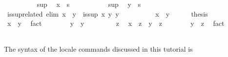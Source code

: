 \begin{isabellebody}
\ \ \ \ \ \ \ \ \isamarkupfalse%
\ sup\ \isamarkupfalse%
\ {\isachardoublequoteopen}x\ {\isasymsqsubseteq}\ s{\isachardoublequoteclose}\ \isacommand{{\isachardot}{\isachardot}}\isamarkupfalse%
\isanewline
\ \ \ \ \ \ \ \ \isamarkupfalse%
\ sup\ \isamarkupfalse%
\ {\isachardoublequoteopen}y\ {\isasymsqsubseteq}\ s{\isachardoublequoteclose}\ \isacommand{{\isachardot}{\isachardot}}\isamarkupfalse%
\isanewline
\ \ \ \ \ \ \isamarkupfalse%
\isanewline
\ \ \ \ \isamarkupfalse%
\isanewline
\ \ \isamarkupfalse%
%
\endisatagproof
{\isafoldproof}%
%
\isadelimproof
\isanewline
%
\endisadelimproof
%
\isadeliminvisible
\isanewline
\ \ %
\endisadeliminvisible
%
\isataginvisible
{}\isamarkupfalse%
\ is{\isacharunderscore}sup{\isacharunderscore}related\ {\isacharbrackleft}elim{\isacharquery}{\isacharbrackright}{\isacharcolon}\ {\isachardoublequoteopen}x\ {\isasymsqsubseteq}\ y\ {\isasymLongrightarrow}\ is{\isacharunderscore}sup\ x\ y\ y{\isachardoublequoteclose}\isanewline
\ \ \isamarkupfalse%
\ {\isacharminus}\isanewline
\ \ \ \ \isamarkupfalse%
\ {\isachardoublequoteopen}x\ {\isasymsqsubseteq}\ y{\isachardoublequoteclose}\isanewline
\ \ \ \ \isamarkupfalse%
\ {\isacharquery}thesis\isanewline
\ \ \ \ \isamarkupfalse%
\isanewline
\ \ \ \ \ \ \isamarkupfalse%
\ {\isachardoublequoteopen}x\ {\isasymsqsubseteq}\ y{\isachardoublequoteclose}\ \isamarkupfalse%
\ fact\isanewline
\ \ \ \ \ \ \isamarkupfalse%
\ {\isachardoublequoteopen}y\ {\isasymsqsubseteq}\ y{\isachardoublequoteclose}\ \isacommand{{\isachardot}{\isachardot}}\isamarkupfalse%
\isanewline
\ \ \ \ \ \ \isamarkupfalse%
\ z\ \isamarkupfalse%
\ {\isachardoublequoteopen}x\ {\isasymsqsubseteq}\ z{\isachardoublequoteclose}\ \ {\isachardoublequoteopen}y\ {\isasymsqsubseteq}\ z{\isachardoublequoteclose}\isanewline
\ \ \ \ \ \ \isamarkupfalse%
\ {\isachardoublequoteopen}y\ {\isasymsqsubseteq}\ z{\isachardoublequoteclose}\ \isamarkupfalse%
\ fact\isanewline
\ \ \ \ \isamarkupfalse%
\isanewline
\ \ \isamarkupfalse%
%
\endisataginvisible
{\isafoldinvisible}%
%
\isadeliminvisible
\isanewline
%
\endisadeliminvisible
\isanewline
\ \ \isamarkupfalse%
%
\begin{isamarkuptext}%
The syntax of the locale commands discussed in this tutorial is

\end{isamarkuptext}
\end{isabellebody}
